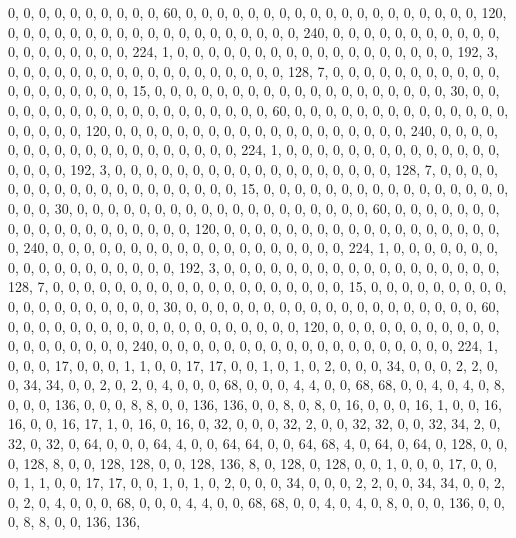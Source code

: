\begin{DoxyCode}
       0, 0, 0, 0, 0, 0, 0, 0, 0, 0, 60, 0, 0, 0, 0, 0, 0, 0, 0, 0, 0, 0, 0, 0, 0, 0, 0, 0, 0, 0, 120, 0, 0, 0, 0,
       0, 0, 0, 0, 0, 0, 0, 0, 0, 0, 0, 0, 0, 0, 0, 240, 0, 0, 0, 0, 0, 0, 0, 0, 0, 0, 0, 0, 0, 0, 0, 0, 0, 0, 0,
       224, 1, 0, 0, 0, 0, 0, 0, 0, 0, 0, 0, 0, 0, 0, 0, 0, 0, 0, 0, 192, 3, 0, 0, 0, 0, 0, 0, 0, 0, 0, 0, 0, 0, 0,
       0, 0, 0, 0, 0, 128, 7, 0, 0, 0, 0, 0, 0, 0, 0, 0, 0, 0, 0, 0, 0, 0, 0, 0, 0, 0, 15, 0, 0, 0, 0, 0, 0, 0, 0,
       0, 0, 0, 0, 0, 0, 0, 0, 0, 0, 0, 30, 0, 0, 0, 0, 0, 0, 0, 0, 0, 0, 0, 0, 0, 0, 0, 0, 0, 0, 0, 60, 0, 0, 0,
       0, 0, 0, 0, 0, 0, 0, 0, 0, 0, 0, 0, 0, 0, 0, 0, 120, 0, 0, 0, 0, 0, 0, 0, 0, 0, 0, 0, 0, 0, 0, 0, 0, 0, 0,
       0, 240, 0, 0, 0, 0, 0, 0, 0, 0, 0, 0, 0, 0, 0, 0, 0, 0, 0, 0, 0, 224, 1, 0, 0, 0, 0, 0, 0, 0, 0, 0, 0, 0, 0,
       0, 0, 0, 0, 0, 0, 192, 3, 0, 0, 0, 0, 0, 0, 0, 0, 0, 0, 0, 0, 0, 0, 0, 0, 0, 0, 128, 7, 0, 0, 0, 0, 0, 0, 0,
       0, 0, 0, 0, 0, 0, 0, 0, 0, 0, 0, 0, 15, 0, 0, 0, 0, 0, 0, 0, 0, 0, 0, 0, 0, 0, 0, 0, 0, 0, 0, 0, 30, 0, 0,
       0, 0, 0, 0, 0, 0, 0, 0, 0, 0, 0, 0, 0, 0, 0, 0, 0, 60, 0, 0, 0, 0, 0, 0, 0, 0, 0, 0, 0, 0, 0, 0, 0, 0, 0, 0,
       0, 120, 0, 0, 0, 0, 0, 0, 0, 0, 0, 0, 0, 0, 0, 0, 0, 0, 0, 0, 0, 240, 0, 0, 0, 0, 0, 0, 0, 0, 0, 0, 0, 0,
       0, 0, 0, 0, 0, 0, 0, 224, 1, 0, 0, 0, 0, 0, 0, 0, 0, 0, 0, 0, 0, 0, 0, 0, 0, 0, 0, 192, 3, 0, 0, 0, 0, 0, 0,
       0, 0, 0, 0, 0, 0, 0, 0, 0, 0, 0, 0, 128, 7, 0, 0, 0, 0, 0, 0, 0, 0, 0, 0, 0, 0, 0, 0, 0, 0, 0, 0, 0, 15, 0,
       0, 0, 0, 0, 0, 0, 0, 0, 0, 0, 0, 0, 0, 0, 0, 0, 0, 0, 30, 0, 0, 0, 0, 0, 0, 0, 0, 0, 0, 0, 0, 0, 0, 0, 0, 0,
       0, 0, 60, 0, 0, 0, 0, 0, 0, 0, 0, 0, 0, 0, 0, 0, 0, 0, 0, 0, 0, 0, 120, 0, 0, 0, 0, 0, 0, 0, 0, 0, 0, 0, 0,
       0, 0, 0, 0, 0, 0, 0, 240, 0, 0, 0, 0, 0, 0, 0, 0, 0, 0, 0, 0, 0, 0, 0, 0, 0, 0, 0, 224, 1, 0, 0, 0, 17, 0,
       0, 0, 1, 1, 0, 0, 17, 17, 0, 0, 1, 0, 1, 0, 2, 0, 0, 0, 34, 0, 0, 0, 2, 2, 0, 0, 34, 34, 0, 0, 2, 0, 2, 0,
       4, 0, 0, 0, 68, 0, 0, 0, 4, 4, 0, 0, 68, 68, 0, 0, 4, 0, 4, 0, 8, 0, 0, 0, 136, 0, 0, 0, 8, 8, 0, 0, 136,
       136, 0, 0, 8, 0, 8, 0, 16, 0, 0, 0, 16, 1, 0, 0, 16, 16, 0, 0, 16, 17, 1, 0, 16, 0, 16, 0, 32, 0, 0, 0, 32, 2,
       0, 0, 32, 32, 0, 0, 32, 34, 2, 0, 32, 0, 32, 0, 64, 0, 0, 0, 64, 4, 0, 0, 64, 64, 0, 0, 64, 68, 4, 0, 64, 0,
       64, 0, 128, 0, 0, 0, 128, 8, 0, 0, 128, 128, 0, 0, 128, 136, 8, 0, 128, 0, 128, 0, 0, 1, 0, 0, 0, 17, 0, 0,
       0, 1, 1, 0, 0, 17, 17, 0, 0, 1, 0, 1, 0, 2, 0, 0, 0, 34, 0, 0, 0, 2, 2, 0, 0, 34, 34, 0, 0, 2, 0, 2, 0, 4,
       0, 0, 0, 68, 0, 0, 0, 4, 4, 0, 0, 68, 68, 0, 0, 4, 0, 4, 0, 8, 0, 0, 0, 136, 0, 0, 0, 8, 8, 0, 0, 136, 136,

\end{DoxyCode}
